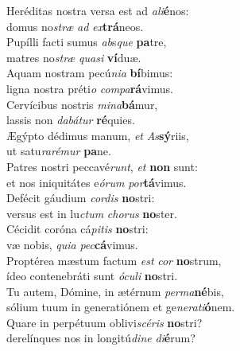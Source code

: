 \evenverse Heréditas nostra versa est ad \textit{a}\textit{li}\textbf{é}nos:~\*\\
\evenverse domus no\textit{stræ} \textit{ad} \textit{ex}\textbf{trá}neos.\\
\oddverse Pupílli facti sumus \textit{ab}s\textit{que} \textbf{pa}tre,~\*\\
\oddverse matres no\textit{stræ} \textit{qua}\textit{si} \textbf{ví}duæ.\\
\evenverse Aquam nostram pecú\textit{ni}\textit{a} \textbf{bí}bimus:~\*\\
\evenverse ligna nostra préti\textit{o} \textit{com}\textit{pa}\textbf{rá}vimus.\\
\oddverse Cervícibus nostris \textit{mi}\textit{na}\textbf{bá}mur,~\*\\
\oddverse lassis non \textit{da}\textit{bá}\textit{tur} \textbf{ré}quies.\\
\evenverse Ægýpto dédimus manum, \textit{et} \textit{As}\textbf{sý}riis,~\*\\
\evenverse ut satu\textit{ra}\textit{ré}\textit{mur} \textbf{pa}ne.\\
\oddverse Patres nostri peccavé\textit{runt}, \textit{et} \textbf{non} sunt:~\*\\
\oddverse et nos iniquitátes e\textit{ó}\textit{rum} \textit{por}\textbf{tá}vimus.\\
\evenverse Defécit gáudium \textit{cor}\textit{dis} \textbf{no}stri:~\*\\
\evenverse versus est in lu\textit{ctum} \textit{cho}\textit{rus} \textbf{no}ster.\\
\oddverse Cécidit coróna cá\textit{pi}\textit{tis} \textbf{no}stri:~\*\\
\oddverse væ nobis, \textit{qui}\textit{a} \textit{pec}\textbf{cá}vimus.\\
\evenverse Proptérea mæstum factum \textit{est} \textit{cor} \textbf{no}strum,~\*\\
\evenverse ídeo contenebráti sunt \textit{ó}\textit{cu}\textit{li} \textbf{no}stri.\\
\oddverse Tu autem, Dómine, in ætérnum \textit{per}\textit{ma}\textbf{né}bis,~\*\\
\oddverse sólium tuum in generatiónem et ge\textit{ne}\textit{ra}\textit{ti}\textbf{ó}nem.\\
\evenverse Quare in perpétuum oblivi\textit{scé}\textit{ris} \textbf{no}stri?~\*\\
\evenverse derelínques nos in longitú\textit{di}\textit{ne} \textit{di}\textbf{é}rum?\\
